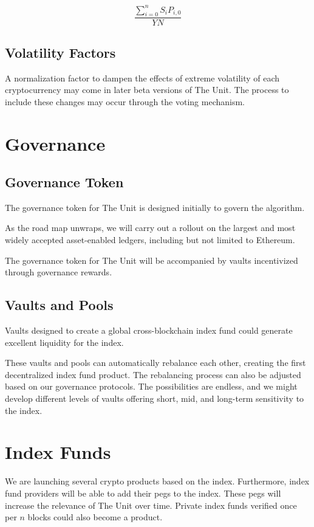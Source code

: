 \documentclass[12pt]{article}
\begin{document}
$$
\frac{\displaystyle{\sum_{i=0}^{n} S_iP_{i,0}}}{Y N}
$$

\subsection{Volatility Factors}

A normalization factor to dampen the effects of extreme volatility of each cryptocurrency may come in later beta versions of The Unit. The process to include these changes may occur through the voting mechanism. 

\section{Governance}

\subsection{Governance Token}


The governance token for The Unit is designed initially to govern the algorithm. 

As the road map unwraps, we will carry out a rollout on the largest and most widely accepted asset-enabled ledgers, including but not limited to Ethereum.

The governance token for The Unit will be accompanied by vaults incentivized through governance rewards.


\subsection{Vaults and Pools}

Vaults designed to create a global cross-blockchain index fund could generate excellent liquidity for the index.

These vaults and pools can automatically rebalance each other, creating the first decentralized index fund product. The rebalancing process can also be adjusted based on our governance protocols. The possibilities are endless, and we might develop different levels of vaults offering short, mid, and long-term sensitivity to the index. 

\section{Index Funds}

We are launching several crypto products based on the index. Furthermore, index fund providers will be able to add their pegs to the index. These pegs will increase the relevance of The Unit over time. Private index funds verified once per $n$ blocks could also become a product. 
\end{document}
